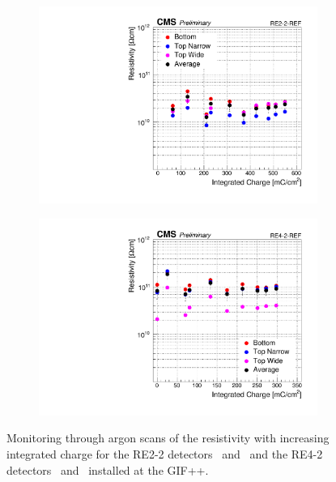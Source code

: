 \begin{figure}[H]
\begin{subfigure}{0.5\linewidth}
    		\includegraphics[width = \linewidth]{fig/chapt5/Resistivity_vs_time_RE2-2-REF.pdf}
        	\caption{\label{fig:Resistivity-time:C}}
    	\end{subfigure}
    	\begin{subfigure}{0.5\linewidth}
			\centering
    		\includegraphics[width = \linewidth]{fig/chapt5/Resistivity_vs_time_RE4-2-REF.pdf}
        	\caption{\label{fig:Resistivity-time:D}}
    	\end{subfigure}
		\caption{\label{fig:Resistivity-time} Monitoring through argon scans of the resistivity with increasing integrated charge for the RE2-2 detectors~ and~ and the RE4-2 detectors~ and~ installed at the GIF++.}
	\end{figure}
	
